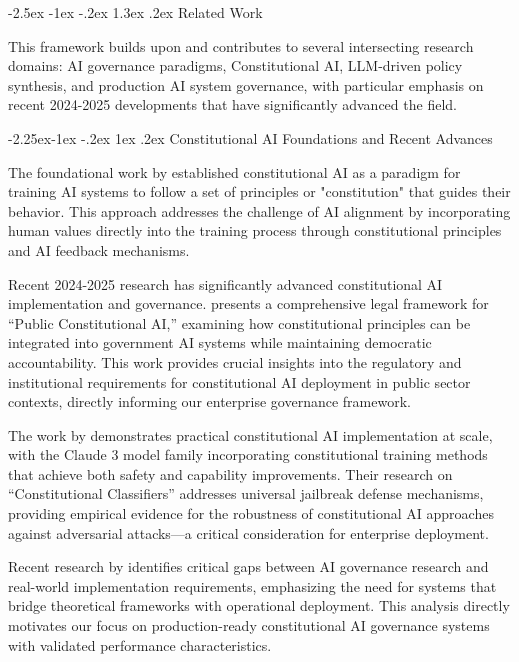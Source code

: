 \documentclass[manuscript,screen,9pt]{acmart}
\makeatletter
\renewcommand\section{\@startsection{section}{1}{\z@}%
  {-2.5ex \@plus -1ex \@minus -.2ex}%
  {1.3ex \@plus.2ex}%
  {\normalfont\Large\bfseries}}
\renewcommand\subsection{\@startsection{subsection}{2}{\z@}%
  {-2.25ex\@plus -1ex \@minus -.2ex}%
  {1ex \@plus .2ex}%
  {\normalfont\large\bfseries}}
\makeatother
\begin{document}
\FloatBarrier %
\section{Related Work}
\label{sec:related_work}

This framework builds upon and contributes to several intersecting research domains: AI governance paradigms, Constitutional AI, LLM-driven policy synthesis, and production AI system governance, with particular emphasis on recent 2024-2025 developments that have significantly advanced the field.

\subsection{Constitutional AI Foundations and Recent Advances}

The foundational work by \citet{Bai2025ConstitutionalAI} established constitutional AI as a paradigm for training AI systems to follow a set of principles or "constitution" that guides their behavior. This approach addresses the challenge of AI alignment by incorporating human values directly into the training process through constitutional principles and AI feedback mechanisms.

Recent 2024-2025 research has significantly advanced constitutional AI implementation and governance. \citet{Abiri2025PublicConstitutional} presents a comprehensive legal framework for ``Public Constitutional AI,'' examining how constitutional principles can be integrated into government AI systems while maintaining democratic accountability. This work provides crucial insights into the regulatory and institutional requirements for constitutional AI deployment in public sector contexts, directly informing our enterprise governance framework.

The work by \citet{Anthropic2024Claude3} demonstrates practical constitutional AI implementation at scale, with the Claude 3 model family incorporating constitutional training methods that achieve both safety and capability improvements. Their research on ``Constitutional Classifiers'' \cite{Anthropic2025Constitutional} addresses universal jailbreak defense mechanisms, providing empirical evidence for the robustness of constitutional AI approaches against adversarial attacks---a critical consideration for enterprise deployment.

Recent research by \citet{SSRC2025AIGovernance} identifies critical gaps between AI governance research and real-world implementation requirements, emphasizing the need for systems that bridge theoretical frameworks with operational deployment. This analysis directly motivates our focus on production-ready constitutional AI governance systems with validated performance characteristics.
\end{document}
